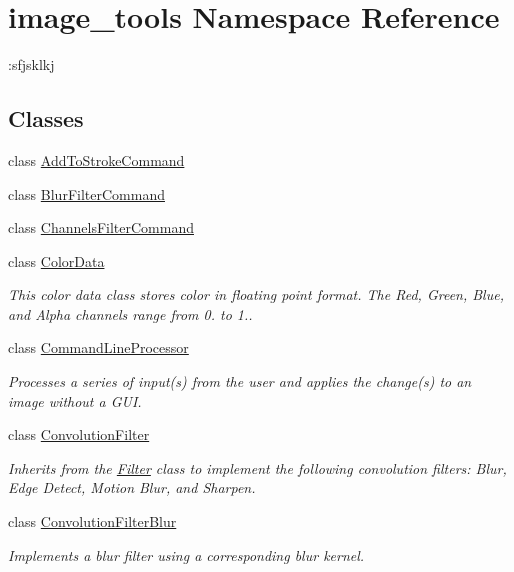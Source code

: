 \hypertarget{namespaceimage__tools}{}\section{image\+\_\+tools Namespace Reference}
\label{namespaceimage__tools}


\+:sfjsklkj  


\subsection*{Classes}
\begin{DoxyCompactItemize}
\item 
class \hyperlink{classimage__tools_1_1AddToStrokeCommand}{Add\+To\+Stroke\+Command}
\item 
class \hyperlink{classimage__tools_1_1BlurFilterCommand}{Blur\+Filter\+Command}
\item 
class \hyperlink{classimage__tools_1_1ChannelsFilterCommand}{Channels\+Filter\+Command}
\item 
class \hyperlink{classimage__tools_1_1ColorData}{Color\+Data}
\begin{DoxyCompactList}\small\item\em This color data class stores color in floating point format. The Red, Green, Blue, and Alpha channels range from 0. to 1.. \end{DoxyCompactList}\item 
class \hyperlink{classimage__tools_1_1CommandLineProcessor}{Command\+Line\+Processor}
\begin{DoxyCompactList}\small\item\em Processes a series of input(s) from the user and applies the change(s) to an image without a G\+UI. \end{DoxyCompactList}\item 
class \hyperlink{classimage__tools_1_1ConvolutionFilter}{Convolution\+Filter}
\begin{DoxyCompactList}\small\item\em Inherits from the \hyperlink{classimage__tools_1_1Filter}{Filter} class to implement the following convolution filters\+: Blur, Edge Detect, Motion Blur, and Sharpen. \end{DoxyCompactList}\item 
class \hyperlink{classimage__tools_1_1ConvolutionFilterBlur}{Convolution\+Filter\+Blur}
\begin{DoxyCompactList}\small\item\em Implements a blur filter using a corresponding blur kernel. \end{DoxyCompactList}\item 

\end{DoxyCompactItemize}
